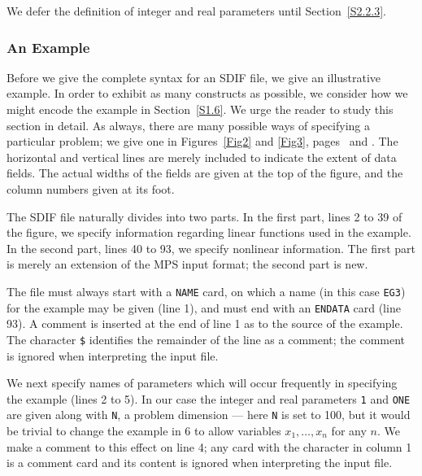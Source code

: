 \documentclass[a4paper]{article}
\begin{document}
We defer the definition of integer and real parameters
until Section~\ref{S2.2.3}.

\subsubsection{\label{S2.1.4}An Example}

Before we  give the complete  syntax for   an  SDIF file,  we give  an
illustrative  example. In  order   to exhibit as  many constructs   as
possible,   we consider    how  we  might    encode  the example    in
Section~\ref{S1.6}.   We   urge the reader to   study this section  in
detail.   As  always, there  are  many possible  ways of specifying  a
particular problem; we give one  in Figures~\ref{Fig2} and \ref{Fig3},
pages~\pageref{Fig2} and \pageref{Fig3}.
The horizontal and vertical lines  are merely included to indicate the
extent of data fields. The  actual  widths of the fields
are given at the top  of the figure,  and the  column numbers given at
its foot.

The SDIF file naturally  divides into two  parts.   In the first part,
lines 2  to 39 of the figure, we specify  information regarding linear
functions used in the example.
In the second part,  lines 40 to 93, we specify nonlinear  information.
The first part  is merely an extension  of  the MPS
input format; the second part is new.

The file must always start with a {\tt NAME}
card, on which a name (in this case {\tt EG3}) for the example  may be
given (line 1), and must end with an {\tt ENDATA}
card (line  93).
A comment is inserted  at the end  of line 1  as to the  source of the
example.  The character {\tt \$} identifies  the remainder of the line
as a comment; the comment is ignored when interpreting the input file.

We next specify  names of parameters
which will occur   frequently in
spe\-cifying the example  (lines 2 to 5).  In our case the integer and
real parameters
{\tt 1} and {\tt ONE} are given along with  {\tt N}, a
problem dimension  --- here  {\tt N} is set to  100,  but it would  be
trivial to change  the example  in  6  to allow  variables   $ x_1
,\ldots, x_n$ for any $n$.  We make a comment  to this effect on
line 4; any card with the character {\tt *} in column  1  is a  comment card
and its content is ignored when interpreting the input file.
\end{document}
